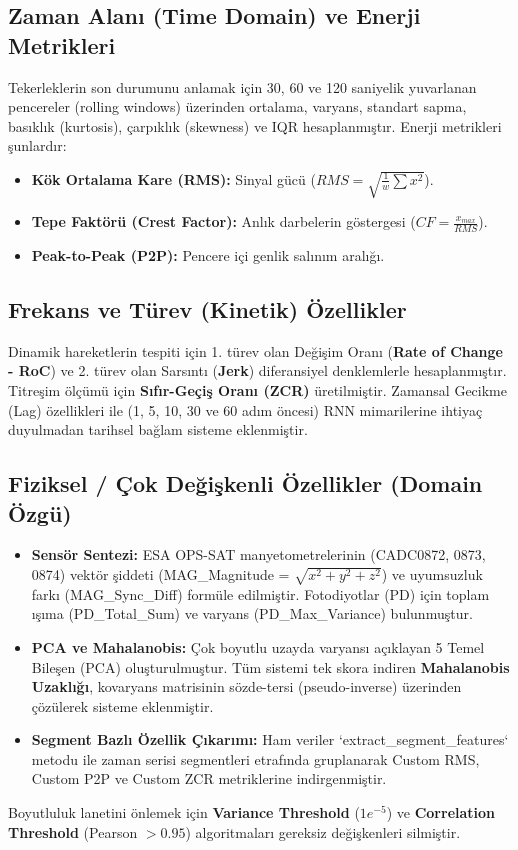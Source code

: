 \documentclass[conference,10pt]{IEEEtran}
\begin{document}
\subsection{Zaman Alanı (Time Domain) ve Enerji Metrikleri}
Tekerleklerin son durumunu anlamak için 30, 60 ve 120 saniyelik yuvarlanan pencereler (rolling windows) üzerinden ortalama, varyans, standart sapma, basıklık (kurtosis), çarpıklık (skewness) ve IQR hesaplanmıştır. Enerji metrikleri şunlardır:
\begin{itemize}
    \item \textbf{Kök Ortalama Kare (RMS):} Sinyal gücü ($RMS = \sqrt{\frac{1}{w}\sum x^2}$).
    \item \textbf{Tepe Faktörü (Crest Factor):} Anlık darbelerin göstergesi ($CF = \frac{x_{max}}{RMS}$).
    \item \textbf{Peak-to-Peak (P2P):} Pencere içi genlik salınım aralığı.
\end{itemize}

\subsection{Frekans ve Türev (Kinetik) Özellikler}
Dinamik hareketlerin tespiti için 1. türev olan Değişim Oranı (\textbf{Rate of Change - RoC}) ve 2. türev olan Sarsıntı (\textbf{Jerk}) diferansiyel denklemlerle hesaplanmıştır. Titreşim ölçümü için \textbf{Sıfır-Geçiş Oranı (ZCR)} üretilmiştir. Zamansal Gecikme (Lag) özellikleri ile (1, 5, 10, 30 ve 60 adım öncesi) RNN mimarilerine ihtiyaç duyulmadan tarihsel bağlam sisteme eklenmiştir.

\subsection{Fiziksel / Çok Değişkenli Özellikler (Domain Özgü)}
\begin{itemize}
    \item \textbf{Sensör Sentezi:} ESA OPS-SAT manyetometrelerinin (CADC0872, 0873, 0874) vektör şiddeti (MAG\_Magnitude = $\sqrt{x^2+y^2+z^2}$) ve uyumsuzluk farkı (MAG\_Sync\_Diff) formüle edilmiştir. Fotodiyotlar (PD) için toplam ışıma (PD\_Total\_Sum) ve varyans (PD\_Max\_Variance) bulunmuştur.
    \item \textbf{PCA ve Mahalanobis:} Çok boyutlu uzayda varyansı açıklayan 5 Temel Bileşen (PCA) oluşturulmuştur. Tüm sistemi tek skora indiren \textbf{Mahalanobis Uzaklığı}, kovaryans matrisinin sözde-tersi (pseudo-inverse) üzerinden çözülerek sisteme eklenmiştir.
    \item \textbf{Segment Bazlı Özellik Çıkarımı:} Ham veriler `extract_segment_features` metodu ile zaman serisi segmentleri etrafında gruplanarak Custom RMS, Custom P2P ve Custom ZCR metriklerine indirgenmiştir.
\end{itemize}
Boyutluluk lanetini önlemek için \textbf{Variance Threshold} ($1e^{-5}$) ve \textbf{Correlation Threshold} (Pearson $>0.95$) algoritmaları gereksiz değişkenleri silmiştir.
\end{document}
